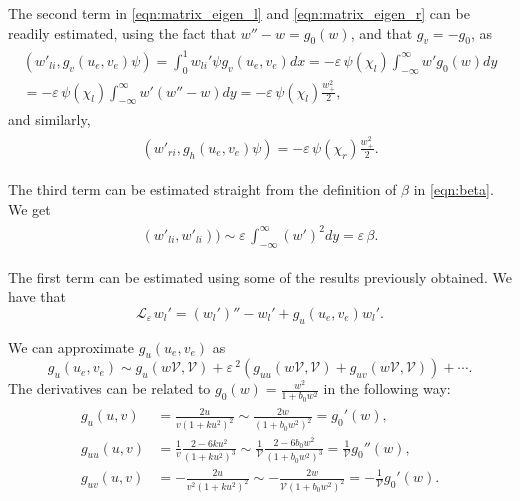 \documentclass[a4paper,10pt]{article}
\newcommand{\Ep}{\ensuremath{\varepsilon\,}}
\newcommand{\VV}{\ensuremath{\mathcal{V}}}
\newcommand{\LL}{\ensuremath{\mathcal{L}}}
\begin{document}
The second term in \eqref{eqn:matrix_eigen_l} and \eqref{eqn:matrix_eigen_r} can be readily estimated, using the fact that $w''-w = g_0(w)$, and that $g_v=-g_0$, as
% 
\begin{equation}
\begin{split}
\begin{aligned}
\label{eqn:2ndterml}
  (w'_{li},g_v(u_e,v_e)\psi) = \int_0^1 w_{li}'\psi g_v(u_e,v_e)dx  =-\Ep\psi(\chi_l)\int_{-\infty}^{\infty}w'g_0(w)dy  \\
  =-\Ep\psi(\chi_l)\int_{-\infty}^{\infty}w'(w''-w)dy = -\Ep\psi(\chi_l)\frac{w_+^2}{2},
\end{aligned}
\end{split}
\end{equation}
% 
and similarly, 
% 
\begin{equation}
\begin{split}
\begin{aligned}
\label{eqn:2ndtermr}
  (w'_{ri},g_h(u_e,v_e)\psi) = -\Ep\psi(\chi_r)\frac{w_+^2}{2}.
\end{aligned}
\end{split}
\end{equation}
% 

The third term can be estimated straight from the definition of $\beta$ in \eqref{eqn:beta}. We get
% 
\begin{equation}
\begin{split}
\begin{aligned}
\label{eqn:third term}
  (w'_{li},w'_{li})) \sim \Ep\int_{-\infty}^{\infty}(w')^2dy = \Ep\beta.
\end{aligned}
\end{split}
\end{equation}
% 

The first term can be estimated using some of the results previously obtained. We have that 
% 
\begin{equation}
  \LL_{\Ep}w_l'=(w_l')''-w_l'+g_u(u_e,v_e)w_l'.
\end{equation}
%

We can approximate $g_u(u_e,v_e)$ as 
% 
\begin{equation}
g_u(u_e,v_e)\sim g_u(w\VV,\VV) + \Ep^2(g_{uu}(w\VV,\VV) + g_{uv}(w\VV,\VV))+\cdots.
\end{equation}
% 
The derivatives can be related to $g_0(w) = \frac{w^2}{1+b_0w^2}$ in the following way:
% 
\begin{equation}
\begin{split}
\begin{aligned}
\label{eqn:derivs_g}
  g_u(u,v)&=\frac{2u}{v(1+ku^2)^2}\sim\frac{2w}{(1+b_0w^2)^2}=g_0'(w),\\
  g_{uu}(u,v)&=\frac{1}{v}\frac{2-6ku^2}{(1+ku^2)^3}\sim\frac{1}{\VV}\frac{2-6b_0w^2}{(1+b_0w^2)^3}=\frac{1}{\VV}g_0''(w),\\
  g_{uv}(u,v)&=-\frac{2u}{v^2(1+ku^2)^2}\sim-\frac{2w}{\VV(1+b_0w^2)^2}=-\frac{1}{\VV}g_0'(w).
\end{aligned}
\end{split}
\end{equation}
% 
\end{document}
